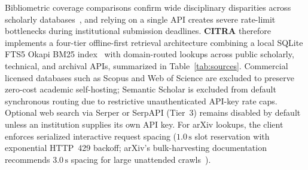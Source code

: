 Bibliometric coverage comparisons confirm wide disciplinary disparities across scholarly databases~\cite{visser2021bibliographic}, and relying on a single API creates severe rate-limit bottlenecks during institutional submission deadlines. \textbf{CITRA} therefore implements a four-tier offline-first retrieval architecture combining a local SQLite FTS5 Okapi BM25 index~\cite{robertson2009bm25} with domain-routed lookups across public scholarly, technical, and archival APIs, summarized in Table~\ref{tab:sources}. Commercial licensed databases such as Scopus and Web of Science are excluded to preserve zero-cost academic self-hosting; Semantic Scholar is excluded from default synchronous routing due to restrictive unauthenticated API-key rate caps. Optional web search via Serper or SerpAPI (Tier~3) remains disabled by default unless an institution supplies its own API key. For arXiv lookups, the client enforces serialized interactive request spacing ($1.0\,\text{s}$ slot reservation with exponential HTTP~429 backoff; arXiv's bulk-harvesting documentation recommends $3.0\,\text{s}$ spacing for large unattended crawls~\cite{arxiv-api}).

